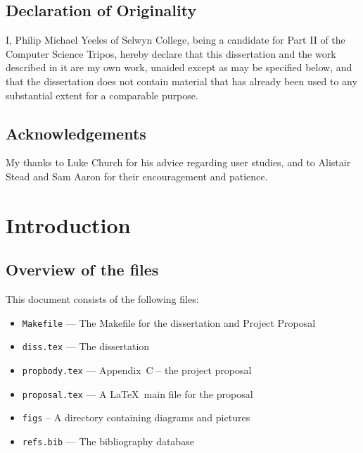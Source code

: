 \documentclass[12pt,twoside,notitlepage]{report}
\begin{document}
\newpage
\section*{Declaration of Originality}

I, Philip Michael Yeeles of Selwyn College, being a candidate for Part
II of the Computer Science Tripos, hereby declare that this dissertation
and the work described in it are my own work, unaided except as may be
specified below, and that the dissertation does not contain material
that has already been used to any substantial extent for a comparable
purpose.

\bigskip
{}

\medskip
{}

\cleardoublepage

\tableofcontents

\listoffigures

\newpage
\section*{Acknowledgements}
My thanks to Luke Church for his advice regarding user studies, and to Alistair
Stead and Sam Aaron for their encouragement and patience.
%


\cleardoublepage        %

\setcounter{page}{1}
\pagestyle{headings}

\chapter{Introduction}

\section{Overview of the files}

This document consists of the following files:

\begin{itemize}
\item {\tt Makefile} --- The Makefile for the dissertation and Project Proposal
\item {\tt diss.tex} --- The dissertation
\item {\tt propbody.tex} --- Appendix~C  -- the project proposal
\item {\tt proposal.tex}  --- A \LaTeX\ main file for the proposal
\item{\tt figs} -- A directory containing diagrams and pictures
\item{\tt refs.bib} --- The bibliography database
\end{itemize}
\end{document}
